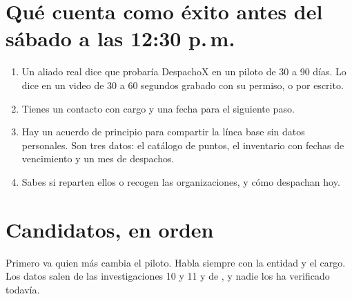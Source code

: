 \documentclass[11pt,letterpaper,parskip=half-]{scrartcl}
\begin{document}
\section{Qué cuenta como éxito antes del sábado a las 12:30 p.\,m.}

\begin{exito}
\begin{enumerate}[label=(\alph*), leftmargin=1.6em]
\item Un aliado real dice que probaría DespachoX en un piloto de 30 a 90 días. Lo dice en un video de 30 a 60 segundos grabado con su permiso, o por escrito.
\item Tienes un contacto con cargo y una fecha para el siguiente paso.
\item Hay un acuerdo de principio para compartir la línea base sin datos personales. Son tres datos: el catálogo de puntos, el inventario con fechas de vencimiento y un mes de despachos.
\item Sabes si reparten ellos o recogen las organizaciones, y cómo despachan hoy.
\end{enumerate}
\end{exito}

\section{Candidatos, en orden}

Primero va quien más cambia el piloto. Habla siempre con la entidad y el cargo. Los datos salen de las investigaciones 10 y 11 y de , y nadie los ha verificado todavía.
\end{document}
